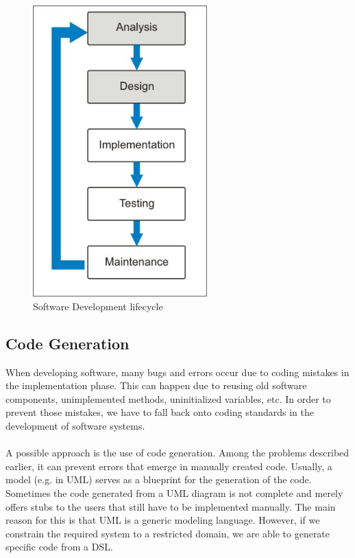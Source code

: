 \begin{figure}[htb]
\centering
\includegraphics[width=0.6\textwidth]{images/lifecycle.jpg}
\caption{Software Development lifecycle}
\label{fig:lifecycle}
\end{figure}

\subsection{Code Generation}

When developing software, many bugs and errors occur due to coding mistakes in the implementation phase. This can happen due to reusing old software components, unimplemented methods, uninitialized variables, etc. In order to prevent those mistakes, we have to fall back onto coding standards in the development of software systems.
\\ \\
A possible approach is the use of code generation. Among the problems described earlier, it can prevent errors that emerge in manually created code. Usually, a model (e.g. in UML) serves as a blueprint for the generation of the code. Sometimes the code generated from a UML diagram is not complete and merely offers stubs to the users that still have to be implemented manually. The main reason for this is that UML is a generic modeling language. However, if we constrain the required system to a restricted domain, we are able to generate specific code from a DSL. 

